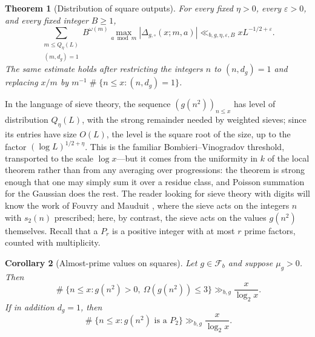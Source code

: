 \documentclass[11pt,reqno]{amsart}
\theoremstyle{plain}
\newtheorem{theorem}{Theorem}[section]
\newtheorem{corollary}[theorem]{Corollary}
\theoremstyle{definition}
\newcommand{\eps}{\varepsilon}
\newcommand{\1}{\mathbf 1}
\DeclareMathOperator{\Card}{\#}
\begin{document}
\begin{theorem}[Distribution of square outputs]\label{thm:square-output-level-intro}
For every fixed $\eta>0$, every $\eps>0$, and every fixed integer $B\ge1$,
\begin{equation}\label{eq:square-output-level-intro}
 \sum_{\substack{m\le Q_\eta(L)\\(m,d_g)=1}}
 B^{\omega(m)}\max_{a\bmod m}|\Delta_{g,\square}(x;m,a)|
 \ll_{b,g,\eta,\eps,B}xL^{-1/2+\eps}.
\end{equation}
The same estimate holds after restricting the integers $n$ to $(n,d_g)=1$ and replacing $x/m$ by $m^{-1}\Card\{n\le x:(n,d_g)=1\}$.
\end{theorem}

In the language of sieve theory, the sequence $(g(n^2))_{n\le x}$ has level of distribution $Q_\eta(L)$, with the strong remainder needed by weighted sieves; since its entries have size $O(L)$, the level is the square root of the size, up to the factor $(\log L)^{1/2+\eta}$. This is the familiar Bombieri--Vinogradov threshold, transported to the scale $\log x$---but it comes from the uniformity in $k$ of the local theorem rather than from any averaging over progressions: the theorem is strong enough that one may simply sum it over a residue class, and Poisson summation for the Gaussian does the rest. The reader looking for sieve theory with digits will know the work of Fouvry and Mauduit \cite{fouvrymauduit-sieve,fouvrymauduit-almost}, where the sieve acts on the integers $n$ with $s_2(n)$ prescribed; here, by contrast, the sieve acts on the values $g(n^2)$ themselves. Recall that a $P_r$ is a positive integer with at most $r$ prime factors, counted with multiplicity.

\begin{corollary}[Almost-prime values on squares]\label{cor:square-almost-primes-intro}
Let $g\in\mathcal F_b$ and suppose $\mu_g>0$.  Then
\[
 \Card\{n\le x:g(n^2)>0,\ \Omega(g(n^2))\le3\}
 \gg_{b,g}\frac{x}{\log_2x}.
\]
If in addition $d_g=1$, then
\[
 \Card\{n\le x:g(n^2)\text{ is a }P_2\}
 \gg_{b,g}\frac{x}{\log_2x}.
\]
\end{corollary}
\end{document}

